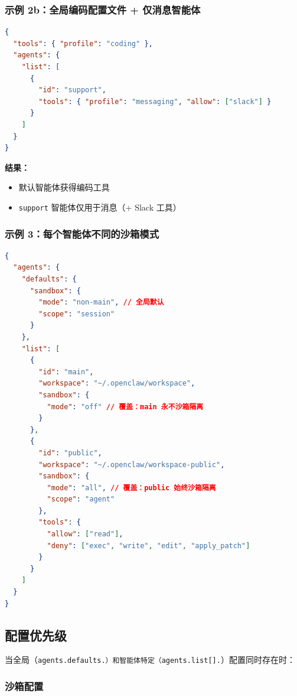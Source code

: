 \hrulefill


\subsubsection{示例 2b：全局编码配置文件 + 仅消息智能体}


\begin{lstlisting}[language=json]
{
  "tools": { "profile": "coding" },
  "agents": {
    "list": [
      {
        "id": "support",
        "tools": { "profile": "messaging", "allow": ["slack"] }
      }
    ]
  }
}
\end{lstlisting}


\textbf{结果：}

\begin{itemize}
  \item 默认智能体获得编码工具
  \item \texttt{support} 智能体仅用于消息（+ Slack 工具）
\end{itemize}


\hrulefill


\subsubsection{示例 3：每个智能体不同的沙箱模式}


\begin{lstlisting}[language=json]
{
  "agents": {
    "defaults": {
      "sandbox": {
        "mode": "non-main", // 全局默认
        "scope": "session"
      }
    },
    "list": [
      {
        "id": "main",
        "workspace": "~/.openclaw/workspace",
        "sandbox": {
          "mode": "off" // 覆盖：main 永不沙箱隔离
        }
      },
      {
        "id": "public",
        "workspace": "~/.openclaw/workspace-public",
        "sandbox": {
          "mode": "all", // 覆盖：public 始终沙箱隔离
          "scope": "agent"
        },
        "tools": {
          "allow": ["read"],
          "deny": ["exec", "write", "edit", "apply_patch"]
        }
      }
    ]
  }
}
\end{lstlisting}


\hrulefill


\subsection{配置优先级}


当全局（\texttt{agents.defaults.\textit{}）和智能体特定（\texttt{agents.list[].}}）配置同时存在时：

\subsubsection{沙箱配置}


